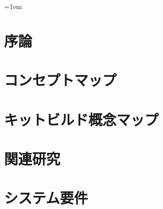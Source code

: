 \addtolength{\headsep}{1cm}
\addtolength{\topmargin}{-2cm}
\addtolength{\textheight}{2cm}


\addtolength{\oddsidemargin}{-1.0cm}
\addtolength{\evensidemargin}{-3.6cm}
\addtolength{\textwidth}{5.5cm}



%
%


%
%


%
%


\setlength{\baselineskip}{1.2\baselineskip}

\pagestyle{plain}
\tableofcontents


\parindent=1em

\clearpage
\pagestyle{headings}

%
%
\chapter{序論}
\label{chap:introduction}


%
%
\chapter{コンセプトマップ}
\label{chap:conceptmap}


%
%
\chapter{キットビルド概念マップ}
\label{chap:kitbuild}


%
%
\chapter{関連研究}
\label{chap:refer}


%
%
\chapter{システム要件}
\label{chap:content}


